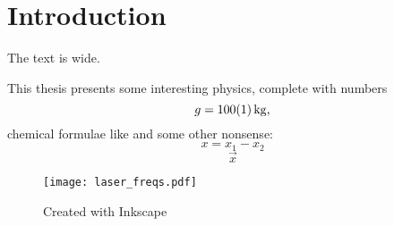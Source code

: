 \chapter{Introduction}\label{ch:introduction}
The text is \the\textwidth {} wide.

This thesis presents some interesting physics, complete with numbers
\begin{equation}
   g = \SI{100+-1}{kg}\text{,}
\end{equation}
chemical formulae like  and some other nonsense:
\begin{equation}
   x = x_1 - x_2
\end{equation}
\begin{equation}
\vec{x}
\end{equation}

\begin{figure}[tb]
	\centering
		\texttt{[image: laser\_freqs.pdf]}
	\caption{Created with Inkscape}
\end{figure}

